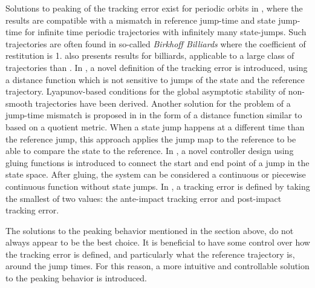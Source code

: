 \documentclass[../DC2017114Bouma.tex]{subfiles}
\begin{document}
Solutions to peaking of the tracking error exist for periodic orbits in \cite{Menini2001,Galeani2008}, where the results are compatible with a mismatch in reference jump-time and state jump-time for infinite time periodic trajectories with infinitely many state-jumps. Such trajectories are often found in so-called \textit{Birkhoff Billiards} where the coefficient of restitution is 1. \cite{Forni2013} also presents results for billiards, applicable to a large class of trajectories than \cite{Menini2001,Galeani2008}. In \cite{Biemond2013,Biemond2016}, a novel definition of the tracking error is introduced, using a distance function which is not sensitive to jumps of the state and the reference trajectory. Lyapunov-based conditions for the global asymptotic stability of non-smooth trajectories have been derived. Another solution for the problem of a jump-time mismatch is proposed in \cite{Baumann2018} in the form of a distance function similar to \cite{Biemond2013,Biemond2016} based on a quotient metric. When a state jump happens at a different time than the reference jump, this approach applies the jump map to the reference to be able to compare the state to the reference. In \cite{Kim2016}, a novel controller design using gluing functions is introduced to connect the start and end point of a jump in the state space. After gluing, the system can be considered a continuous or piecewise continuous function without state jumps. In \cite{Yang2017}, a tracking error is defined by taking the smallest of two values: the ante-impact tracking error and post-impact tracking error.

The solutions to the peaking behavior mentioned in the section above, do not always appear to be the best choice. It is beneficial to have some control over how the tracking error is defined, and particularly what the reference trajectory is, around the jump times. For this reason, a more intuitive and controllable solution to the peaking behavior is introduced.
\end{document}
